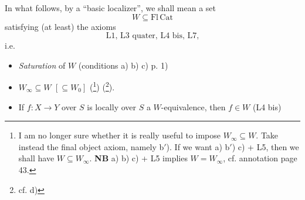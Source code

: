 In what follows, by a ``basic localizer'', we shall mean a set
\[
W \subseteq \mathrm{Fl}\,\mathrm{Cat}
\]
satisfying (at least) the axioms %
\[
\text{L1, L3 quater, L4 bis, L7,}
\]
i.e.

\begin{itemize}
\item[a)] \textit{Saturation} of $W$ (conditions a) b) c) p. 1)

\item[b)] $W_\infty \subseteq W$ $[\subseteq W_0]$ (\footnote[30]{I am no longer sure whether it is really useful to impose $W_\infty \subseteq W$. Take instead the final object axiom, namely b$'$). If we want a) b$'$) c) + L5, then we shall have $W \subseteq W_\infty$. \textbf{NB} a) b) c) + L5 implies $W = W_\infty$, cf. annotation page 43.}) (\footnote[31]{cf. d)}).

\item[c)] If $f : X \longrightarrow Y$ over $S$ is locally over $S$ a $W$-equivalence, then $f \in W$ (L4 bis)
\end{itemize}